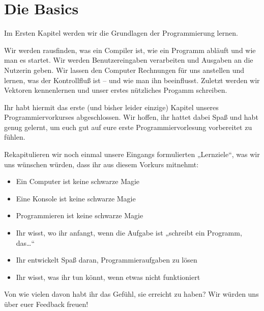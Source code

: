 \chapter{Die Basics}
\pagestyle{empty}

Im Ersten Kapitel werden wir die Grundlagen der Programmierung lernen.

Wir werden rausfinden, was ein Compiler ist, wie ein Programm abläuft und wie
man es startet. Wir werden Benutzereingaben verarbeiten und Ausgaben an die
Nutzerin geben. Wir lassen den Computer Rechnungen für uns anstellen und
lernen, was der Kontrollfluß ist -- und wie man ihn beeinflusst. Zuletzt werden
wir Vektoren kennenlernen und unser erstes nützliches Progamm schreiben.

\pagestyle{fancy}




















\clearpage
\pagestyle{empty}

Ihr habt hiermit das erste (und bisher leider einzige) Kapitel unseres
Programmiervorkurses abgeschlossen. Wir hoffen, ihr hattet dabei Spaß und habt
genug gelernt, um euch gut auf eure erste Programmiervorlesung vorbereitet zu
fühlen.

Rekapitulieren wir noch einmal unsere Eingangs formulierten „Lernziele“, was
wir uns wünschen würden, dass ihr aus diesem Vorkurs mitnehmt:
\begin{itemize}
    \item Ein Computer ist keine schwarze Magie
    \item Eine Konsole ist keine schwarze Magie
    \item Programmieren ist keine schwarze Magie
    \item Ihr wisst, wo ihr anfangt, wenn die Aufgabe ist „schreibt ein
        Programm, das\dots“
    \item Ihr entwickelt Spaß daran, Programmieraufgaben zu lösen
    \item Ihr wisst, was ihr tun könnt, wenn etwas nicht funktioniert
\end{itemize}

Von wie vielen davon habt ihr das Gefühl, sie erreicht zu haben? Wir würden uns
über euer Feedback freuen!
